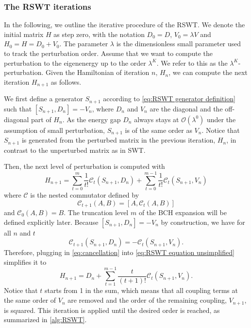 \documentclass[%
 reprint,
 amsmath,amssymb,
 aps,
pra,
noeprint,
superscriptaddress,
]{revtex4-2}
\begin{document}
\subsubsection{The RSWT iterations}
\label{sec:RSWT steps}

In the following, we outline the iterative procedure of the RSWT.
We denote the initial matrix $H$ as step zero, with the notation $D_0 = D$, $ V_0 = \lambda V$ and $H_{0} = H = D_0 + V_0$.
The parameter $\lambda$ is the dimensionless small parameter used to track the perturbation order.
Assume that we want to compute the perturbation to the eigenenergy up to the order $\lambda^K$.
We refer to this as the $\lambda^K$-perturbation.
Given the Hamiltonian of iteration $n$, $H_n$, we can compute the next iteration $H_{n+1}$ as follows.


We first define a generator $S_{n+1}$ according to \cref{eq:RSWT generator definition} such that $[S_{n+1},D_n]=-V_n$, where $D_n$ and $V_n$ are the diagonal and the off-diagonal part of $H_n$.
As the energy gap $D_n$ always stays at $\mathcal{O}(\lambda^0)$ under the assumption of small perturbation, $S_{n+1}$ is of the same order as $V_n$.
Notice that $S_{n+1}$ is generated from the perturbed matrix in the previous iteration, $H_n$, in contrast to the unperturbed matrix as in SWT.

Then, the next level of perturbation is computed with
\begin{equation}
    \label{eq:RSWT equation unsimplified}
    H_{n+1} =
    \sum_{t=0}^m
    \frac{1}{t!}
    \mathcal{C}_t(S_{n+1}, D_n)
    +
    \sum_{t=0}^{m-1}
    \frac{1}{t!}
    \mathcal{C}_t(S_{n+1}, V_n)
\end{equation}
where $\mathcal{C}$ is the nested commutator defined by
\begin{equation}
    \mathcal{C}_{t+1}(A, B) = [A, \mathcal{C}_{t}(A, B)]
\end{equation}
and $\mathcal{C}_{0}(A, B) = B$.
The truncation level $m$ of the BCH expansion will be defined explicitly later.
Because $[S_{n+1},D_n]=-V_n$ by construction, we have for all $n$ and $t$
\begin{equation}
    \label{eq:cancellation}
    \mathcal{C}_{t+1}(S_{n+1},D_n)
    =-\mathcal{C}_t(S_{n+1}, V_n)
    .
\end{equation}
Therefore, plugging in \cref{eq:cancellation} into \cref{eq:RSWT equation unsimplified} simplifies it to
\begin{equation}
    \label{eq:RSWT equation}
    H_{n+1} = D_n +
    \sum_{t=1}^{m-1}
    \frac{t}{(t+1)!}
    \mathcal{C}_t(S_{n+1}, V_n)
    .
\end{equation}
Notice that $t$ starts from 1 in the sum, which means that all coupling terms at the same order of $V_n$ are removed and the order of the remaining coupling, $V_{n+1}$, is squared.
This iteration is applied until the desired order is reached, as summarized in \cref{alg:RSWT}.
\end{document}
